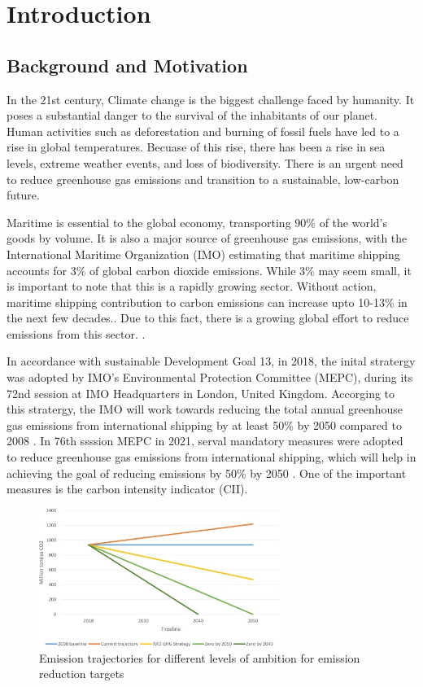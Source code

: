 \chapter{Introduction}
\setcounter{page}{1}

\section{Background and Motivation}

In the 21st century, Climate change is the biggest challenge faced by humanity. It poses a substantial danger to the survival of the inhabitants of our planet.
Human activities such as deforestation and burning of fossil fuels have led to a rise in global temperatures.
Becuase of this rise, there has been a rise in sea levels, extreme weather events, and loss of biodiversity.
There is an urgent need to reduce greenhouse gas emissions and transition to a sustainable, low-carbon future.

Maritime is essential to the global economy, transporting 90\% of the world's goods by volume.
It is also a major source of greenhouse gas emissions, with the International Maritime Organization (IMO)
estimating that maritime shipping accounts for 3\% of global carbon dioxide emissions.
While 3\% may seem small, it is important to note that this is a rapidly growing sector.
Without action, maritime shipping contribution to carbon emissions can increase upto 10-13\% in the next few decades..
Due to this fact, there is a growing global effort to reduce emissions from this sector. \autocite{king_anthony_2022}.

In accordance with sustainable Development Goal 13, in 2018, the inital stratergy was adopted by IMO's Environmental Protection Committee (MEPC),
during its 72nd session at IMO Headquarters in London, United Kingdom. Accorging to this stratergy,
the IMO will work towards reducing the total annual greenhouse gas emissions from international shipping by at least 50\% by 2050 compared to 2008 \autocite{imo-2018}.
In 76th ssssion MEPC in 2021, serval mandatory measures were adopted to reduce greenhouse gas emissions from international shipping,
which will help in achieving the goal of reducing emissions by 50\% by 2050 \autocite{imo-2021}. One of the important measures is the carbon intensity indicator (CII).

\begin{figure}[ht]
    \centering
    \includegraphics[width=0.7\textwidth]{images/emission_trajactory.jpg}
    \caption{Emission trajectories for different levels of ambition for emission reduction targets}
    \label{emissionTrajectory}
\end{figure}


